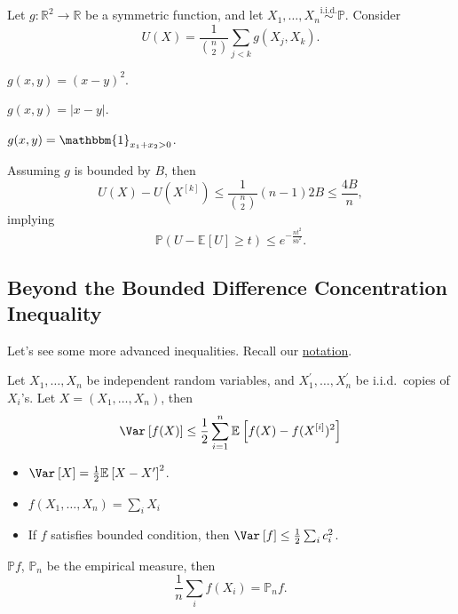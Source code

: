 Let \(g\colon \mathbb{R} ^2 \to \mathbb{R} \) be a symmetric function, and let \(X_1, \dots , X_n \overset{\text{i.i.d.} }{\sim } \mathbb{P} \). Consider
\[
	U(X) = \frac{1}{\binom{n}{2}} \sum_{j < k} g(X_j, X_k).
\]

\begin{eg}
	\(g(x, y) = (x - y)^2\).
\end{eg}

\begin{eg}
	\(g(x, y) = \vert x - y \vert \).
\end{eg}

\begin{eg}
	\(g(x, y) = \mathbbm{1}_{x_1 + x_2 > 0} \).
\end{eg}

Assuming \(g\) is bounded by \(B\), then
\[
	U(X) - U(X^{[k]}) \leq \frac{1}{\binom{n}{2}} (n-1) 2B \leq \frac{4B}{n},
\]
implying
\[
	\mathbb{P} (U - \mathbb{E}_{}\left[U \right] \geq t) \leq e^{-\frac{nt^2}{8b^2}}.
\]

\subsection{Beyond the Bounded Difference Concentration Inequality}
Let's see some more advanced inequalities. Recall our \hyperref[not:lec5]{notation}.

\begin{theorem}\label{thm:Efron-Stein-inequality}
	Let \(X_1, \dots , X_n\) be independent random variables, and \(X_1^{\prime} , \dots , X_n^{\prime} \) be i.i.d.\ copies of \(X_i\)'s. Let \(X = (X_1, \dots , X_n)\), then
	\[
		\Var_{}\left[f(X) \right] \leq \frac{1}{2} \sum_{i=1}^{n} \mathbb{E}_{}\left[f(X) - f(X^{[i]})^2 \right]
	\]
\end{theorem}

\begin{remark}
	\begin{itemize}
		\item \(\Var_{}\left[X \right] = \frac{1}{2}\mathbb{E}_{}\left[X-X^{\prime}  \right]^2 \).
		\item \(f(X_1, \dots , X_n) = \sum_{i} X_i\)
		\item If \(f\) satisfies bounded condition, then \(\Var_{}\left[f \right] \leq \frac{1}{2}\sum_{i} c_i^2\).
	\end{itemize}

\end{remark}

\begin{notation}
	\(\mathbb{P} f\), \(\mathbb{P} _n \) be the empirical measure, then
	\[
		\frac{1}{n} \sum_{i} f(X_i) = \mathbb{P} _n f.
	\]
\end{notation}

